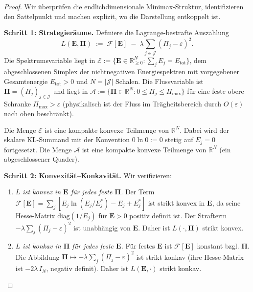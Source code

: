 \documentclass[12pt,a4paper]{article}
\theoremstyle{definition}
\theoremstyle{plain}
\theoremstyle{remark}
\begin{document}
\begin{proof}
Wir überprüfen die endlichdimensionale Minimax-Struktur, identifizieren den
Sattelpunkt und machen explizit, wo die Darstellung entkoppelt ist.

\smallskip\noindent
\textbf{Schritt 1: Strategieräume.}\;
Definiere die Lagrange-bestrafte Auszahlung
\[
  L(\mathbf{E}, \boldsymbol{\Pi})
  \;:=\;
  \mathcal{F}[\mathbf{E}]
  \;-\;
  \lambda \sum_{j \in \mathcal{J}} (\Pi_j - \varepsilon)^2.
\]
Die Spektrumsvariable liegt in
$\mathcal{E} := \{\mathbf{E} \in \mathbb{R}^N_{\ge 0} :
\sum_j E_j = E_{\mathrm{tot}}\}$, dem abgeschlossenen Simplex der nichtnegativen
Energiespektren mit vorgegebener Gesamtenergie $E_{\mathrm{tot}} > 0$ und
$N = |\mathcal{J}|$ Schalen. Die Flussvariable ist
$\boldsymbol{\Pi} = (\Pi_j)_{j\in\mathcal{J}}$ und liegt in
$\mathcal{A} := \{\boldsymbol{\Pi} \in \mathbb{R}^{N} :
0 \le \Pi_j \le \Pi_{\max}\}$ für eine feste obere Schranke
$\Pi_{\max} > \varepsilon$ (physikalisch ist der Fluss im Trägheitsbereich
durch $O(\varepsilon)$ nach oben beschränkt).

Die Menge $\mathcal{E}$ ist eine kompakte konvexe Teilmenge von
$\mathbb{R}^N$. Dabei wird der skalare KL-Summand mit der Konvention
$0\ln0:=0$ stetig auf $E_j=0$ fortgesetzt. Die Menge $\mathcal{A}$ ist
eine kompakte konvexe Teilmenge von $\mathbb{R}^{N}$ (ein abgeschlossener
Quader).

\smallskip\noindent
\textbf{Schritt 2: Konvexität--Konkavität.}\;
Wir verifizieren:
\begin{enumerate}[label=(\alph*)]
  \item \emph{$L$ ist konvex in $\mathbf{E}$ für jedes feste
    $\boldsymbol{\Pi}$.}\;
    Der Term $\mathcal{F}[\mathbf{E}] = \sum_j [E_j\ln(E_j/E_j^*)
    - E_j + E_j^*]$ ist strikt konvex in $\mathbf{E}$, da seine
    Hesse-Matrix $\mathrm{diag}(1/E_j)$ für
    $\mathbf{E} > 0$ positiv definit ist. Der Strafterm
    $-\lambda\sum_j(\Pi_j - \varepsilon)^2$ ist unabhängig
    von $\mathbf{E}$. Daher ist $L(\cdot, \boldsymbol{\Pi})$
    strikt konvex.
  \item \emph{$L$ ist konkav in $\boldsymbol{\Pi}$ für jedes feste
    $\mathbf{E}$.}\;
    Für festes $\mathbf{E}$ ist $\mathcal{F}[\mathbf{E}]$ konstant
    bzgl. $\boldsymbol{\Pi}$. Die Abbildung $\boldsymbol{\Pi} \mapsto
    -\lambda\sum_j(\Pi_j - \varepsilon)^2$ ist strikt konkav
    (ihre Hesse-Matrix ist $-2\lambda\,I_{N}$, negativ definit).
    Daher ist $L(\mathbf{E}, \cdot)$ strikt konkav.
\end{enumerate}


\end{proof}
\end{document}
